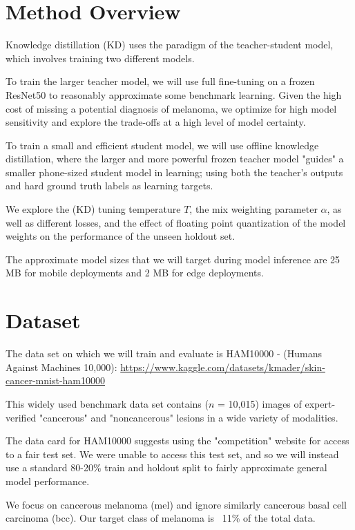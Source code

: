 \documentclass[conference]{IEEEtran}
\begin{document}
\section*{Method Overview}

Knowledge distillation (KD) uses the paradigm of the teacher-student model, which involves training two different models.

To train the larger teacher model, we will use full fine-tuning on a frozen ResNet50 to reasonably approximate some benchmark learning. Given the high cost of missing a potential diagnosis of melanoma, we optimize for high model sensitivity and explore the trade-offs at a high level of model certainty. 

To train a small and efficient student model, we will use offline knowledge distillation, where the larger and more powerful frozen teacher model "guides" a smaller phone-sized student model in learning; using both the teacher's outputs and hard ground truth labels as learning targets. 

We explore the (KD) tuning temperature $T$, the mix weighting parameter $\alpha$, as well as different losses, and the effect of floating point quantization of the model weights on the performance of the unseen holdout set.

The approximate model sizes that we will target during model inference are 25 MB for mobile deployments and 2 MB for edge deployments.

\section*{Dataset}

The data set on which we will train and evaluate is HAM10000 - (Humans Against Machines 10,000): \url{https://www.kaggle.com/datasets/kmader/skin-cancer-mnist-ham10000}

This widely used benchmark data set contains ($n$ = 10,015) images of expert-verified "cancerous" and "noncancerous" lesions in a wide variety of modalities. 

The data card for HAM10000 suggests using the "competition" website for access to a fair test set. We were unable to access this test set, and so we will instead use a standard 80-20\%  train and holdout split to fairly approximate general model performance. 

We focus on cancerous melanoma (mel) and ignore similarly cancerous basal cell carcinoma (bcc). Our target class of melanoma is ~11\% of the total data.
\end{document}

